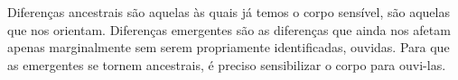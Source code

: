Diferenças ancestrais são aquelas às quais já temos o corpo sensível, são aquelas que nos orientam. Diferenças emergentes são as diferenças que ainda nos afetam apenas marginalmente sem serem propriamente identificadas, ouvidas. Para que as emergentes se tornem ancestrais, é preciso sensibilizar o corpo para ouvi-las.